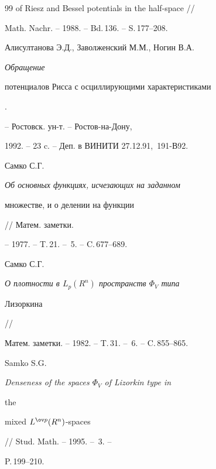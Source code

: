 \begin{thebibliography}{99}
{of Riesz and Bessel potentials in the half-space} // 


Math. Nachr. -- 1988. -- Bd.\,136. -- S.\,177--208. 




Алисултанова Э.Д., Заволженский М.М., Ногин В.А. {\em Обращение  


потенциалов Рисса с осциллирующими характеристиками}.


-- Ростовск. ун-т. -- Ростов-на-Дону,


1992. -- 23 c. -- Деп. в ВИНИТИ 27.12.91, \No\,191-В92. 




Самко С.Г. {\em Об основных функциях, исчезающих на заданном  


множестве, и о делении на функции} // Матем. заметки. 


-- 1977. -- T.\,21. -- \No\,5. -- C.\,677--689. 




Самко С.Г. {\em О плотности в $L_p(R^n)$ пространств $\Phi_V$ типа 


Лизоркина} //  


Матем. заметки. -- 1982. -- T.\,31. -- \No\,6. -- C.\,855--865. 




Samko S.G. {\em Denseness of the spaces $\Phi_V$ of Lizorkin type in 


the  


mixed $L^{\ov p}(R^n)$-spaces} // Stud. Math. -- 1995. -- \No\,3. -- 


P.\,199--210. 


 


\end{thebibliography} 


 


\vskip 2cm 


 






 


\label{end} 


 


 


